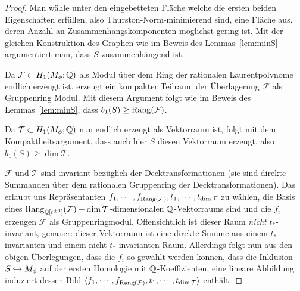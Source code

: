     \begin{proof}
        Man wähle unter den eingebetteten Fläche welche die ersten beiden Eigenschaften erfüllen, also Thurston-Norm-minimierend sind, eine Fläche aus, deren Anzahl an Zusammenhangskomponenten möglichst gering ist. Mit der gleichen Konstruktion des Graphen wie im Beweis des Lemmas~\ref{lem:minS} argumentiert man, dass $S$ zusammenhängend ist.

        Da $\mathcal F \subset H_1(M_\phi;\mathbb{Q})$ als Modul über dem Ring der rationalen Laurentpolynome endlich erzeugt ist, erzeugt ein kompakter Teilraum der Überlagerung $\mathcal F$ als Gruppenring Modul. Mit diesem Argument folgt wie im Beweis des Lemmas~\ref{lem:minS}, dass $b_1(S)\geq \operatorname{Rang}(\mathcal F)$. 

        Da $\mathcal T \subset H_1(M_\phi;\mathbb{Q})$ nun endlich erzeugt als Vektorraum ist, folgt mit dem Kompaktheitsargument, dass auch hier $S$ diesen Vektorraum erzeugt, also $b_1(S)\geq \dim \mathcal T$. 

        $\mathcal F$ und $\mathcal T$ sind invariant bezüglich der Decktransformationen (sie sind direkte Summanden über dem rationalen Gruppenring der Decktransformationen). Das erlaubt uns Repräsentanten $f_1,\cdots,f_{\operatorname{Rang}(\mathcal F)},t_1,\cdots,t_{\dim\mathcal T}$ zu wählen, die Basis eines $\operatorname{Rang}_{\mathbb{Q}[t^{\pm 1}]}(\mathcal F)+\dim\mathcal T$-dimensionalen $\mathbb{Q}$-Vektorraums sind und die $f_i$ erzeugen $\mathcal F$ als Gruppenringmodul. Offensichtlich ist dieser Raum \emph{nicht} $t_*$-invariant, genauer: dieser Vektorraum ist eine direkte Summe aus einem $t_*$-invarianten und einem nicht-$t_*$-invarianten Raum. Allerdings folgt nun aus den obigen Überlegungen, dass die $f_i$ so gewählt werden können, dass die Inklusion $S\hookrightarrow M_\phi$ auf der ersten Homologie mit $\mathbb{Q}$-Koeffizienten, eine lineare Abbildung induziert dessen Bild $\langle f_1,\cdots,f_{\operatorname{Rang}(\mathcal F)},t_1,\cdots,t_{\dim\mathcal T} \rangle$ enthält.
    \end{proof}

